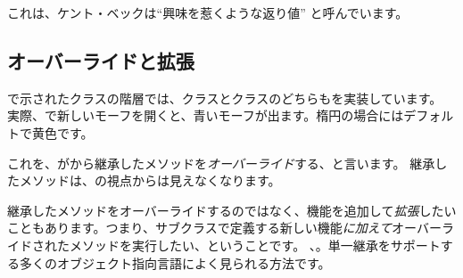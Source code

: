 \documentclass[a4paper,10pt,twoside]{book}
\begin{document}
これは、ケント・ベックは``興味を惹くような返り値'' \cite{Beck97a} と呼んでいます。


\subsection{オーバーライドと拡張}

で示されたクラスの階層では、クラスと\mbox{}クラスのどちらもを実装しています。
実際、で新しいモーフを開くと、青いモーフが出ます。楕円の場合にはデフォルトで黄色です。

これを、がから継承したメソッドを\emph{オーバーライド}する、と言います。
継承したメソッドは、の視点からは見えなくなります。

継承したメソッドをオーバーライドするのではなく、機能を追加して\emph{拡張}したいこともあります。つまり、サブクラスで定義する新しい機能\emph{に加えて}オーバーライドされたメソッドを実行したい、ということです。
、。単一継承をサポートする多くのオブジェクト指向言語によく見られる方法です。
\end{document}
